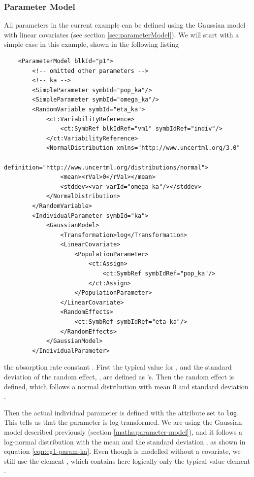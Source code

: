 \subsubsection{Parameter Model}
\label{sec:eg1-pk}
All parameters in the current example can be defined
using the Gaussian model with linear covariates (see section
\ref{sec:parameterModel}). We will start with a simple case in this
example, shown in the following listing 
\lstset{language=XML}
\begin{lstlisting}
    <ParameterModel blkId="p1">
        <!-- omitted other parameters -->
        <!-- ka -->
        <SimpleParameter symbId="pop_ka"/>
        <SimpleParameter symbId="omega_ka"/>
        <RandomVariable symbId="eta_ka">
            <ct:VariabilityReference>
                <ct:SymbRef blkIdRef="vm1" symbIdRef="indiv"/>
            </ct:VariabilityReference>
            <NormalDistribution xmlns="http://www.uncertml.org/3.0" 
                definition="http://www.uncertml.org/distributions/normal">
                <mean><rVal>0</rVal></mean>
                <stddev><var varId="omega_ka"/></stddev>
            </NormalDistribution>
        </RandomVariable>
        <IndividualParameter symbId="ka">
            <GaussianModel>
                <Transformation>log</Transformation>
                <LinearCovariate>
                    <PopulationParameter>
                        <ct:Assign>
                            <ct:SymbRef symbIdRef="pop_ka"/>
                        </ct:Assign>
                    </PopulationParameter>
                </LinearCovariate>
                <RandomEffects>
                    <ct:SymbRef symbIdRef="eta_ka"/>
                </RandomEffects>
            </GaussianModel>
        </IndividualParameter>
\end{lstlisting}
the absorption rate constant .  First the typical value for , 
and the standard deviation of the random effect, , are
defined as 's. Then the random effect 
is defined, which follows a normal distribution with mean $0$ and
standard deviation .

Then the actual individual parameter  is
defined with the  attribute set to
\texttt{log}. This tells us that the parameter is log-transformed. We
are using the Gaussian model described previously (section
\ref{maths:parameter-model}), and it follows a log-normal distribution
with the mean  and the standard deviation
 , as shown in equation \ref{eqn:eg1-param-ka}.
Even though  is modelled without a covariate, we still use the
element , which contains here logically only the
typical value element .

